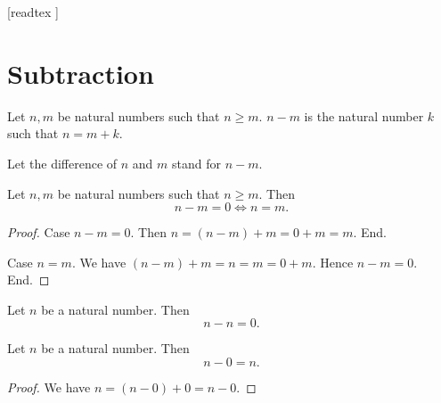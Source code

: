 \documentclass[10pt]{article}
\begin{document}
  \begin{imports}
    \begin{forthel}
      [readtex ]
    \end{forthel}
  \end{imports}


  \section{Subtraction}

  \begin{forthel}
    \begin{definition}
      Let $n, m$ be natural numbers such that $n \geq m$.
      $n - m$ is the natural number $k$ such that $n = m + k$.
    \end{definition}

    Let the difference of $n$ and $m$ stand for $n - m$.
  \end{forthel}

  \begin{forthel}
    \begin{proposition}
      Let $n, m$ be natural numbers such that $n \geq m$.
      Then \[ n - m = 0 \iff n = m. \]
    \end{proposition}
    \begin{proof}
      Case $n - m = 0$.
        Then $n
          = (n - m) + m
          = 0 + m
          = m$.
      End.

      Case $n = m$.
        We have $(n - m) + m
          = n
          = m
          = 0 + m$.
        Hence $n - m = 0$.
      End.
    \end{proof}
  \end{forthel}

  \begin{forthel}
    \begin{corollary}
      Let $n$ be a natural number.
      Then \[ n - n = 0. \]
    \end{corollary}
  \end{forthel}

  \begin{forthel}
    \begin{proposition}
      Let $n$ be a natural number.
      Then \[ n - 0 = n. \]
    \end{proposition}
    \begin{proof}
      We have $n
        = (n - 0) + 0
        = n - 0$.
    \end{proof}
  \end{forthel}
\end{document}
